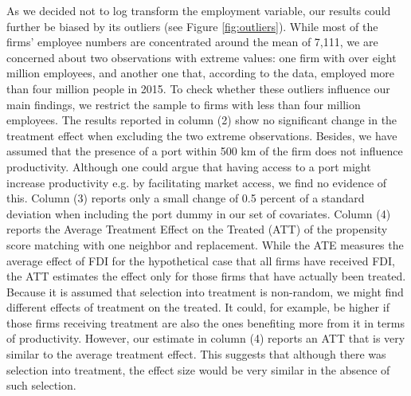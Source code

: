 \documentclass[a4paper,11pt]{scrartcl}
\begin{document}
As we decided not to log transform the employment variable, our results could further be biased by its outliers (see Figure \ref{fig:outliers}). While most of the firms' employee numbers are concentrated around the mean of 7,111, we are concerned about two observations with extreme values: one firm with over eight million employees, and another one that, according to the data, employed more than four million people in 2015. To check whether these outliers influence our main findings, we restrict the sample to firms with less than four million employees. The results reported in column (2) show no significant change in the treatment effect when excluding the two extreme observations. Besides, we have assumed that the presence of a port within 500 km of the firm does not influence productivity. Although one could argue that having access to a port might increase productivity e.g. by facilitating market access, we find no evidence of this.  Column (3) reports only a small change of 0.5 percent of a standard deviation when including the port dummy in our set of covariates. 
Column (4) reports the Average Treatment Effect on the Treated (ATT) of the propensity score matching with one neighbor and replacement. While the ATE measures the average effect of FDI for the hypothetical case that all firms have received FDI, the ATT estimates the effect only for those firms that have actually been treated. Because it is assumed that selection into treatment is non-random, we might find different effects of treatment on the treated. 
It could, for example, be higher if those firms receiving treatment are also the ones benefiting more from it in terms of productivity. %
 However, our estimate in column (4) reports an ATT that is very similar to the average treatment effect. This suggests that although there was selection into treatment, the effect size would be very similar in the absence of such selection. %
 
\end{document}
